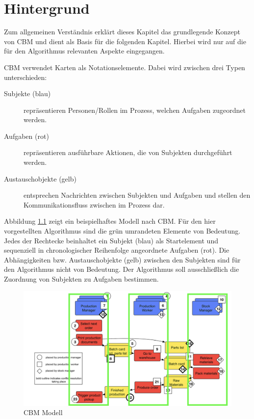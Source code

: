 %
%
% 
% 
% 

\chapter{Hintergrund} %
\label{cha:hintergrund}
Zum allgemeinen Verständnis erklärt dieses Kapitel das grundlegende Konzept von CBM und dient als Basis für die folgenden Kapitel. Hierbei wird nur auf die für den Algorithmus relevanten Aspekte eingegangen. 

CBM verwendet Karten als Notationselemente. Dabei wird zwischen drei Typen unterschieden:
\begin{description}
	\item[Subjekte (blau)] repräsentieren Personen/Rollen im Prozess, welchen Aufgaben zugeordnet werden.
	\item[Aufgaben (rot)] repräsentieren ausführbare Aktionen, die von Subjekten durchgeführt werden.
	\item[Austauschobjekte (gelb)] entsprechen Nachrichten zwischen Subjekten und Aufgaben und stellen den Kommunikationsfluss zwischen im Prozess dar.
\end{description}

Abbildung \ref{fig:cbm-grundstruktur} zeigt ein beispielhaftes Modell nach CBM. Für den hier vorgestellten Algorithmus sind die grün umrandeten Elemente von Bedeutung. Jedes der Rechtecke beinhaltet ein Subjekt (blau) als Startelement und sequenziell in chronologischer Reihenfolge angeordnete Aufgaben (rot). Die Abhängigkeiten bzw. Austauschobjekte (gelb) zwischen den Subjekten sind für den Algorithmus nicht von Bedeutung. Der Algorithmus soll ausschließlich die Zuordnung von Subjekten zu Aufgaben bestimmen.
\begin{figure}[H]
	\centering 
	\begin{minipage}[b]{0.9\textwidth} 
		\includegraphics[width=\textwidth]{figures/cbm-grundstruktur.png} 		\caption{CBM Modell 
		\protect~\cite{oppl2016linking}} 
		\label{fig:cbm-grundstruktur} 
	\end{minipage}
\end{figure}
